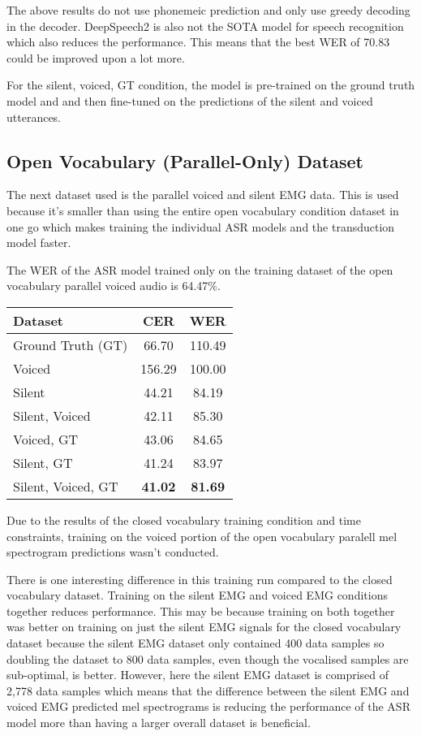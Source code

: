 The above results do not use phonemeic prediction and only use greedy decoding
in the decoder. DeepSpeech2 is also not the SOTA model for speech recognition
which also reduces the performance. This means that the best WER of 70.83 could
be improved upon a lot more.

For the silent, voiced, GT condition, the model is pre-trained on the
ground truth model and and then fine-tuned on the predictions of the
silent and voiced utterances.

\subsection{Open Vocabulary (Parallel-Only) Dataset}

The next dataset used is the parallel voiced and silent EMG data. This is used because
it's smaller than using the entire open vocabulary condition dataset in one go which
makes training the individual ASR models and the transduction model faster.

The WER of the ASR model trained only on the
training dataset of the open vocabulary parallel voiced audio is 64.47\%.

{\small\begin{center}
\begin{tabular} {  l  c  c  }
\hline
\textbf{Dataset} & \textbf{CER} & \textbf{WER} \\
\hline
Ground Truth (GT) & 66.70 & 110.49 \\
Voiced & 156.29 & 100.00 \\
Silent & 44.21 & 84.19 \\
Silent, Voiced & 42.11 & 85.30 \\
Voiced, GT & 43.06 & 84.65 \\
Silent, GT & 41.24 & 83.97 \\
\hline
Silent, Voiced, GT & \textbf{41.02} & \textbf{81.69} \\
\hline
\end{tabular}
\end{center}}

Due to the results of the closed vocabulary training condition and time constraints,
training on the voiced portion of the open vocabulary paralell mel spectrogram
predictions wasn't conducted.

There is one interesting difference in this training run compared to the closed
vocabulary dataset. Training on the silent EMG and voiced EMG conditions together
reduces performance. This may be because training on both together was better
on training on just the silent EMG signals for the closed vocabulary dataset
because the silent EMG dataset only contained 400 data samples so doubling
the dataset to 800 data samples, even though the vocalised samples are sub-optimal,
is better. However, here the silent EMG dataset is comprised of 2,778 data samples
which means that the difference between the silent EMG and voiced EMG predicted
mel spectrograms is reducing the performance of the ASR model more than having a
larger overall dataset is beneficial.